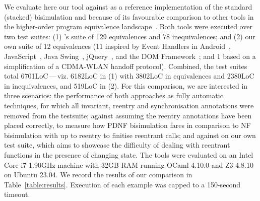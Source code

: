 We evaluate here our tool against \Hobbit{} as a reference implementation of
the standard (stacked) bisimulation and because of its favourable comparison to
other tools in the higher-order program equivalence
landscape~\cite[Sec.~9]{KoutavasLT22}. Both tools were executed over two test
suites: (1) \Hobbit{}'s suite of 129 equivalences and 78 inequivalences; and
(2) our own suite of 12 equivalences (11 inspired by Event Handlers in
Android~\cite{android_events,android_timer}, JavaScript~\cite{mdn_web_docs},
Java Swing~\cite{java_swing}, jQuery~\cite{jquery}, and the DOM
Framework~\cite{dom_standard}; and 1 based on a simplification of a CDMA-WLAN
handoff protocol\cite{DBLP:journals/ejwcn/KimSSQ08}). Combined, the test suites
total 6701LoC\,---\,viz. 6182LoC in (1) with 3802LoC in equivalences and
2380LoC in inequivalences, and 519LoC in (2). For this comparison, we are interested in three scenarios: the performance of both approaches as fully automatic
techniques, for which all invariant, reentry and synchronisation
annotations were removed from the \Hobbit{} testsuite; \SLHobbit{} against \Hobbit{} assuming the reentry annotations have been placed correctly, to measure how PDNF
bisimulation fares in comparison to NF bisimulation with up to reentry to finitise reentrant calls; and \SLHobbit{} against \Hobbit{} on our own test suite, which aims to showcase the
difficulty of dealing with reentrant functions in the presence of changing
state. The tools were evaluated on an Intel Core i7 1.90GHz machine with 32GB
RAM running OCaml 4.10.0 and Z3 4.8.10 on Ubuntu 23.04. We record the results
of our comparison in Table~\ref{table:results}. Execution of each example was
capped to a 150-second timeout.

